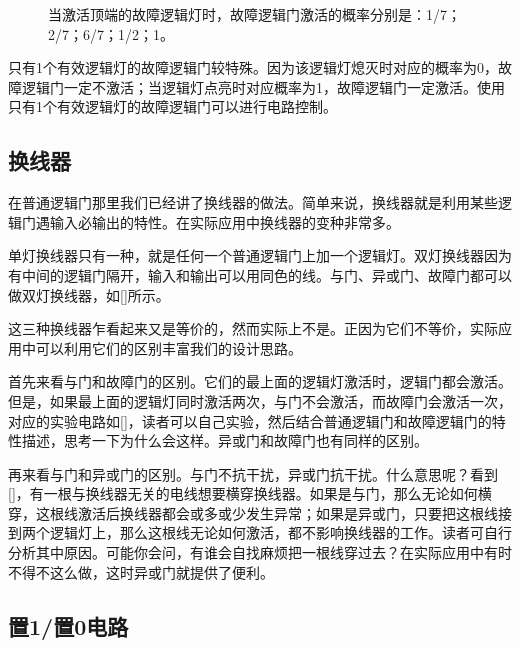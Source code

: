 \begin{figure}[!h]
\begin{center}
\end{center}
\caption{当激活顶端的故障逻辑灯时，故障逻辑门激活的概率分别是：\protect{}1/7；\protect{}2/7；\protect{}6/7；\protect{}1/2；\protect{}1。}
\label{i54:58}
\end{figure}

只有1个有效逻辑灯的故障逻辑门较特殊。因为该逻辑灯熄灭时对应的概率为0，故障逻辑门一定不激活；当逻辑灯点亮时对应概率为1，故障逻辑门一定激活。使用只有1个有效逻辑灯的故障逻辑门可以进行电路控制。

\subsection{换线器}
在普通逻辑门那里我们已经讲了换线器的做法。简单来说，换线器就是利用某些逻辑门遇输入必输出的特性。在实际应用中换线器的变种非常多。

单灯换线器只有一种，就是任何一个普通逻辑门上加一个逻辑灯。双灯换线器因为有中间的逻辑门隔开，输入和输出可以用同色的线。与门、异或门、故障门都可以做双灯换线器，如\autoref{}所示。

这三种换线器乍看起来又是等价的，然而实际上不是。正因为它们不等价，实际应用中可以利用它们的区别丰富我们的设计思路。

首先来看与门和故障门的区别。它们的最上面的逻辑灯激活时，逻辑门都会激活。但是，如果最上面的逻辑灯同时激活两次，与门不会激活，而故障门会激活一次，对应的实验电路如\autoref{}，读者可以自己实验，然后结合普通逻辑门和故障逻辑门的特性描述，思考一下为什么会这样。异或门和故障门也有同样的区别。

再来看与门和异或门的区别。与门不抗干扰，异或门抗干扰。什么意思呢？看到\autoref{}，有一根与换线器无关的电线想要横穿换线器。如果是与门，那么无论如何横穿，这根线激活后换线器都会或多或少发生异常；如果是异或门，只要把这根线接到两个逻辑灯上，那么这根线无论如何激活，都不影响换线器的工作。读者可自行分析其中原因。可能你会问，有谁会自找麻烦把一根线穿过去？在实际应用中有时不得不这么做，这时异或门就提供了便利。

\subsection{置1/置0电路}

